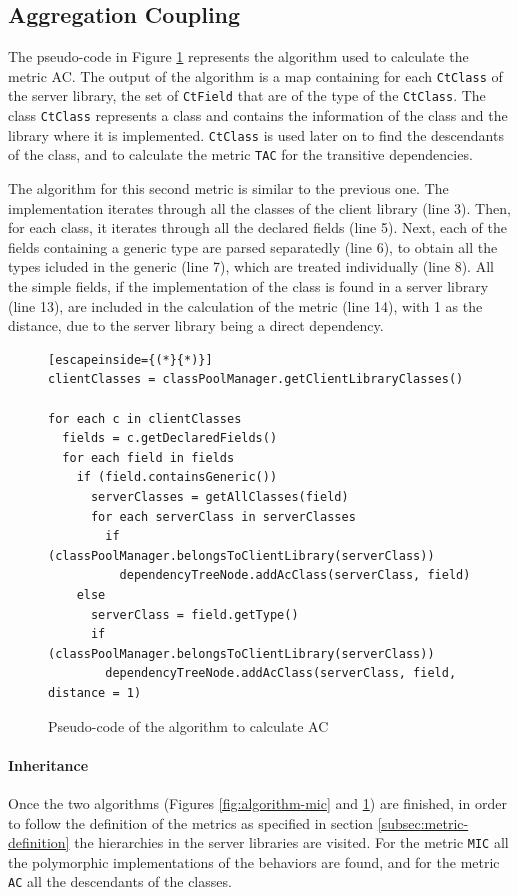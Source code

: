 \subsection{Aggregation Coupling}
The pseudo-code in Figure \ref{fig:algorithm-ac} represents the algorithm used to calculate the metric AC. The output of the algorithm is a map containing for each \texttt{CtClass} of the server library, the set of \texttt{CtField} that are of the type of the \texttt{CtClass}. The class \texttt{CtClass} represents a class and contains the information of the class and the library where it is implemented. \texttt{CtClass} is used later on to find the descendants of the class, and to calculate the metric \texttt{TAC} for the transitive dependencies.

The algorithm for this second metric is similar to the previous one. The implementation iterates through all the classes of the client library (line 3). Then, for each class, it iterates through all the declared fields (line 5). Next, each of the fields containing a generic type are parsed separatedly (line 6), to obtain all the types icluded in the generic  (line 7), which are treated individually (line 8). All the simple fields, if the implementation of the class is found in a server library (line 13), are included in the calculation of the metric (line 14), with 1 as the distance, due to the server library being a direct dependency.

\begin{figure}[ht!]
\begin{lstlisting}[escapeinside={(*}{*)}]
clientClasses = classPoolManager.getClientLibraryClasses()

for each c in clientClasses
  fields = c.getDeclaredFields()
  for each field in fields
    if (field.containsGeneric())
      serverClasses = getAllClasses(field)
      for each serverClass in serverClasses
        if (classPoolManager.belongsToClientLibrary(serverClass))
          dependencyTreeNode.addAcClass(serverClass, field)
    else
      serverClass = field.getType()
      if (classPoolManager.belongsToClientLibrary(serverClass))
        dependencyTreeNode.addAcClass(serverClass, field, distance = 1)
\end{lstlisting}
\caption{Pseudo-code of the algorithm to calculate AC}
\label{fig:algorithm-ac}
\end{figure}

\paragraph{Inheritance}\label{paragraph:inheritance}
Once the two algorithms (Figures \ref{fig:algorithm-mic} and \ref{fig:algorithm-ac}) are finished, in order to follow the definition of the metrics as specified in section \ref{subsec:metric-definition} the hierarchies in the server libraries are visited. For the metric \texttt{MIC} all the polymorphic implementations of the behaviors are found, and for the metric \texttt{AC} all the descendants of the classes.

